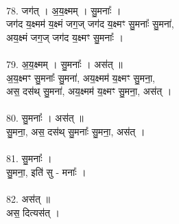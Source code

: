 \\
78. जग॑त् । अ॒य॒क्ष्मम् । सु॒मनाः᳚ ।\\
जग॑द य॒क्ष्मम॑ य॒क्ष्मं जग॒ज् जग॑द य॒क्ष्मꣳ सु॒मनाः᳚ सु॒मना॑,\\
अय॒क्ष्मं जग॒ज् जग॑द य॒क्ष्मꣳ सु॒मनाः᳚ ।\\
\\
79. अ॒य॒क्ष्मम् । सु॒मनाः᳚ । अस॑त् ॥\\
अ॒य॒क्ष्मꣳ सु॒मनाः᳚ सु॒मना॑, अय॒क्ष्मम॑ य॒क्ष्मꣳ सु॒मना॒,\\
अस॒ दस॑थ् सु॒मना॑, अय॒क्ष्मम॑ य॒क्ष्मꣳ सु॒मना॒, अस॑त् ।\\
\\
80. सु॒मनाः᳚ । अस॑त् ॥\\
सु॒मना॒, अस॒ दस॑थ् सु॒मनाः᳚ सु॒मना॒, अस॑त् ।\\
\\
81. सु॒मनाः᳚ ।\\
सु॒मना॒, इति॑ सु - मनाः᳚ ।\\
\\
82. अस॑त् ॥\\
अस॒ दित्यस॑त् ।\\
\\
